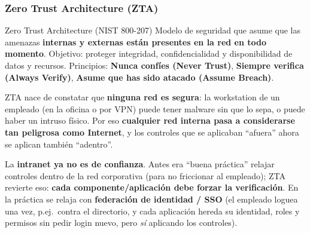 \documentclass[../main.tex]{subfiles}
\begin{document}
\subsubsection{Zero Trust Architecture (ZTA)}

\begin{definicion}{Zero Trust Architecture (NIST 800-207)}
Modelo de seguridad que asume que las amenazas \textbf{internas y externas están
presentes en la red en todo momento}. Objetivo: proteger integridad,
confidencialidad y disponibilidad de datos y recursos. Principios:
\textbf{Nunca confíes (Never Trust)}, \textbf{Siempre verifica (Always Verify)},
\textbf{Asume que has sido atacado (Assume Breach)}.
\end{definicion}

ZTA nace de constatar que \textbf{ninguna red es segura}: la workstation de un
empleado (en la oficina o por VPN) puede tener malware sin que lo sepa, o puede
haber un intruso físico. Por eso \textbf{cualquier red interna pasa a
considerarse tan peligrosa como Internet}, y los controles que se aplicaban
``afuera'' ahora se aplican también ``adentro''.

\begin{destacado}
La \textbf{intranet ya no es de confianza}. Antes era ``buena práctica'' relajar
controles dentro de la red corporativa (para no friccionar al empleado); ZTA
revierte eso: \textbf{cada componente/aplicación debe forzar la verificación}.
En la práctica se relaja con \textbf{federación de identidad / SSO} (el empleado
loguea una vez, p.ej.\ contra el directorio, y cada aplicación hereda su
identidad, roles y permisos sin pedir login nuevo, pero \emph{sí} aplicando los
controles).
\end{destacado}
\end{document}

